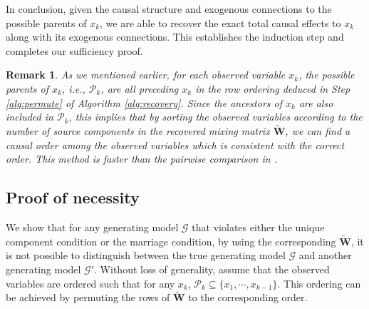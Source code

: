 \documentclass[12pt]{article}
\newtheorem{remark}{Remark}
\newcommand{\bW}{\mathbf{W}}
\newcommand{\mbs}[1]{{\boldsymbol{\mathbf{#1}}}}
\renewcommand{\bm}{\mbs}
\begin{document}
In conclusion, given the causal structure and exogenous connections to the possible parents of $x_k$, we are able to recover the exact total causal effects to $x_k$ along with its exogenous connections. This establishes the induction step and completes our sufficiency proof. 

\begin{remark}
As we mentioned earlier, for each observed variable $x_k$, the possible parents of $x_k$, i.e., $\mathcal{P}_k$, are all preceding $x_k$ in the row ordering deduced in Step \ref{alg:permute} of Algorithm \ref{alg:recovery}. Since the ancestors of $x_k$ are also included in $\mathcal{P}_k$, this implies that by sorting the observed variables according to the number of source components in the recovered mixing matrix $\tilde{\bW}$, we can find a causal order among the observed variables which is consistent with the correct order. This method is faster than the pairwise comparison in \citep[Lemma 5]{salehkaleybar2020learning}.
\end{remark}

\subsection{Proof of necessity} \label{app:proof_necessity}
We show that for any generating model $\mathcal{G}$ that violates either the unique component condition or the marriage condition, by using the corresponding $\tilde{\bW}$, it is not possible to distinguish between the true generating model $\mathcal{G}$ and another generating model $\mathcal{G}'$. Without loss of generality, assume that the observed variables are ordered such that for any $x_k$, $\mathcal{P}_k\subseteq \{x_1,\cdots,x_{k-1}\}$. This ordering can be achieved by permuting the rows of $\tilde{\bW}$ to the corresponding order.

\end{document}
